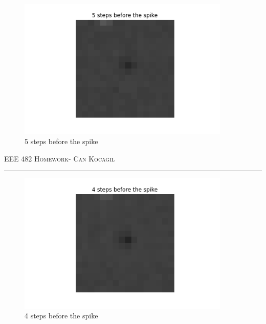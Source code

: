 \documentclass[12pt]{amsart}
\begin{document}
\begin{figure}[h]
    \centering
    \includegraphics[width = 0.9\textwidth]{images/5.png}
    \caption{5 steps before the spike}
\end{figure}


\newpage
{\scshape EEE 482} \hfill {\scshape \large  Homework-\relax} \hfill {\scshape Can Kocagil}
\smallskip
\hrule
\vspace{2mm}

\begin{figure}[h]
    \centering
    \includegraphics[width = 0.9\textwidth]{images/4.png}
    \caption{4 steps before the spike}
\end{figure}
\end{document}
